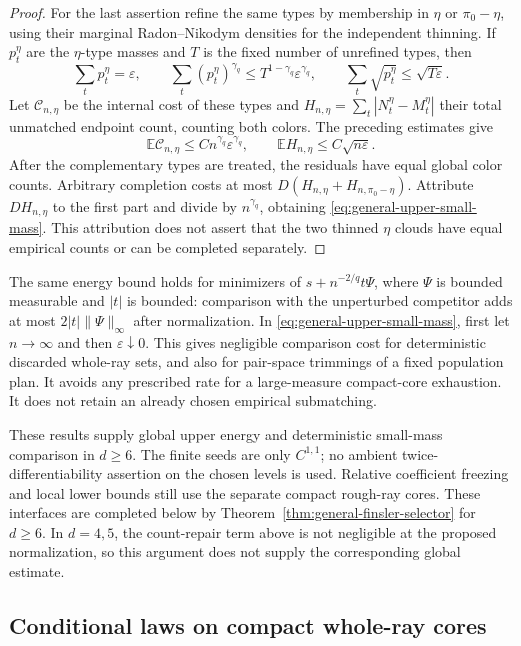 \documentclass[11pt,reqno]{amsart}
\theoremstyle{definition}
\theoremstyle{remark}
\numberwithin{equation}{section}
\newcommand{\E}{\mathbb E}
\begin{document}
\begin{proof}
For the last assertion refine the same types by membership in
\(\eta\) or \(\pi_0-\eta\), using their marginal
Radon--Nikodym densities for the independent thinning. If
\(p_t^\eta\) are the \(\eta\)-type masses and \(T\) is the fixed
number of unrefined types, then
\[
 \sum_t p_t^\eta=\varepsilon,\qquad
 \sum_t(p_t^\eta)^{\gamma_q}
       \le T^{1-\gamma_q}\varepsilon^{\gamma_q},\qquad
 \sum_t\sqrt{p_t^\eta}\le\sqrt{T\varepsilon}.
\]
Let \(\mathcal C_{n,\eta}\) be the internal cost of these types and
\(H_{n,\eta}=\sum_t|N_t^\eta-M_t^\eta|\) their total unmatched
endpoint count, counting both colors. The preceding estimates give
\[
 \E\mathcal C_{n,\eta}\le Cn^{\gamma_q}
                         \varepsilon^{\gamma_q},\qquad
 \E H_{n,\eta}\le C\sqrt{n\varepsilon}.
\]
After the complementary types are treated, the residuals have equal
global color counts. Arbitrary completion costs at most
\(D(H_{n,\eta}+H_{n,\pi_0-\eta})\). Attribute
\(D H_{n,\eta}\) to the first part and divide by
\(n^{\gamma_q}\), obtaining \eqref{eq:general-upper-small-mass}.
This attribution does not assert that the two thinned \(\eta\)
clouds have equal empirical counts or can be completed separately.
\end{proof}

The same energy bound holds for minimizers of
\(s+n^{-2/q}t\Psi\), where \(\Psi\) is bounded measurable and
\(|t|\) is bounded: comparison with the unperturbed competitor adds
at most \(2|t|\|\Psi\|_\infty\) after normalization.
In \eqref{eq:general-upper-small-mass}, first let \(n\to\infty\)
and then \(\varepsilon\downarrow0\). This gives negligible comparison
cost for deterministic discarded whole-ray sets, and also for
pair-space trimmings of a fixed population plan. It avoids any
prescribed rate for a large-measure compact-core exhaustion.
It does not retain an already chosen empirical submatching.

These results supply global upper energy and deterministic small-mass
comparison in \(d\ge6\). The finite seeds are only \(C^{1,1}\);
no ambient twice-differentiability assertion on the chosen levels is
used. Relative coefficient freezing and local lower bounds still use
the separate compact rough-ray cores. These interfaces are completed
below by Theorem~\ref{thm:general-finsler-selector} for \(d\ge6\). In \(d=4,5\), the count-repair term above is not
negligible at the proposed normalization, so this argument does not
supply the corresponding global estimate.

\subsection{Conditional laws on compact whole-ray cores}
\label{subsec:compact-conditional-laws}
\end{document}
